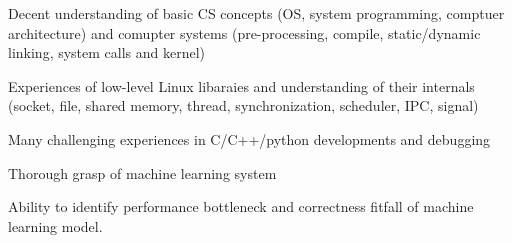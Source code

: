 


\begin{cventries}

\begin{small}
    {
      \begin{cvitems} %
        \item {Decent understanding of basic CS concepts (OS, system programming, comptuer architecture) and comupter systems (pre-processing, compile, static/dynamic linking, system calls and kernel)}
	\item {Experiences of low-level Linux libaraies and understanding of their internals (socket, file, shared memory, thread, synchronization, scheduler, IPC, signal)}
	\item {Many challenging experiences in C/C++/python developments and debugging}
	\item {Thorough grasp of machine learning system}
	\item {Ability to identify performance bottleneck and correctness fitfall of machine learning model.}
	\newline
      \end{cvitems}
    }
\end{small}

\end{cventries}


